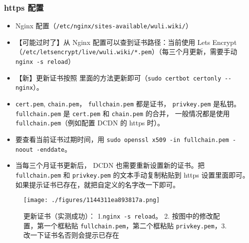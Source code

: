 \subsubsection{https 配置}
\begin{itemize}
\item Nginx 配置（\verb`/etc/nginx/sites-available/wuli.wiki/`）
\item 【可能过时了】从 Nginx 配置可以查到证书路径：当前使用 Lets Encrypt （\verb`/etc/letsencrypt/live/wuli.wiki/*.pem`）（每三个月更新，需要手动 \verb`nginx -s reload`）
\item 【新】更新证书按照 里面的方法更新即可（\verb`sudo certbot certonly --nginx`）。
\item \verb`cert.pem`, \verb`chain.pem`， \verb`fullchain.pem` 都是证书， \verb`privkey.pem` 是私钥。 \verb`fullchain.pem` 是 \verb`cert.pem` 和 \verb`chain.pem` 的合并， 一般情况都是使用 \verb`fullchain.pem`（例如配置 DCDN 的 https 时）。
\item 要查看当前证书过期时间，用 \verb`sudo openssl x509 -in fullchain.pem -noout -enddate`。
\item 当每三个月证书更新后， DCDN 也需要重新设置新的证书。把 \verb`fullchain.pem` 和 \verb`privkey.pem` 的文本手动复制粘贴到 https 设置里面即可。如果提示证书已存在，就把自定义的名字改一下即可。
\end{itemize}
\begin{figure}[ht]
\centering
\texttt{[image: ./figures/1144311ea893817a.png]}
\caption{更新证书（实测成功）： 1.\verb`nginx -s reload`。 2. 按图中的修改配置，第一个框粘贴 \verb`fullchain.pem`，第二个框粘贴 \verb`privkey.pem`，3.改一下证书名否则会提示已存在} \label{fig_myCode_1}
\end{figure}
